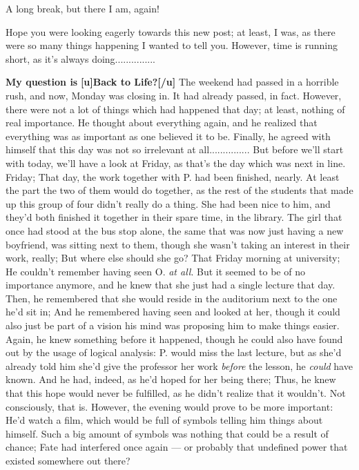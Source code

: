 A long break, but there I am, again!

Hope you were looking eagerly towards this new post; at least, I was, as there were so many things happening I wanted to tell you. However, time is running short, as it's always doing...............

\textbf{My question is}
\textbf{[u]Back to Life?[/u]}
The weekend had passed in a horrible rush, and now, Monday was closing in. 
It had already passed, in fact. 
However, there were not a lot of things which had happened that day; at least, nothing of real importance. He thought about everything again, and he realized that everything was as important as one believed it to be. Finally, he agreed with himself that this day was not so irrelevant at all...............
But before we'll start with today, we'll have a look at Friday, as that's the day which was next in line. 
Friday; That day, the work together with P. had been finished, nearly. At least the part the two of them would do together, as the rest of the students that made up this group of four didn't really do a thing. She had been nice to him, and they'd both finished it together in their spare time, in the library. The girl that once had stood at the bus stop alone, the same that was now just having a new boyfriend, was sitting next to them, though she wasn't taking an interest in their work, really; But where else should she go?
That Friday morning at university; He couldn't remember having seen O. \emph{at all}. But it seemed to be of no importance anymore, and he knew that she just had a single lecture that day. Then, he remembered that she would reside in the auditorium next to the one he'd sit in; And he remembered having seen and looked at her, though it could also just be part of a vision his mind was proposing him to make things easier. 
Again, he knew something before it happened, though he could also have found out by the usage of logical analysis: P. would miss the last lecture, but as she'd already told him she'd give the professor her work \emph{before} the lesson, he \emph{could} have known. And he had, indeed, as he'd hoped for her being there; Thus, he knew that this hope would never be fulfilled, as he didn't realize that it wouldn't. Not consciously, that is. 
However, the evening would prove to be more important: He'd watch a film, which would be full of symbols telling him things about himself. 
Such a big amount of symbols was nothing that could be a result of chance; Fate had interfered once again --- or probably that undefined power that existed somewhere out there?
